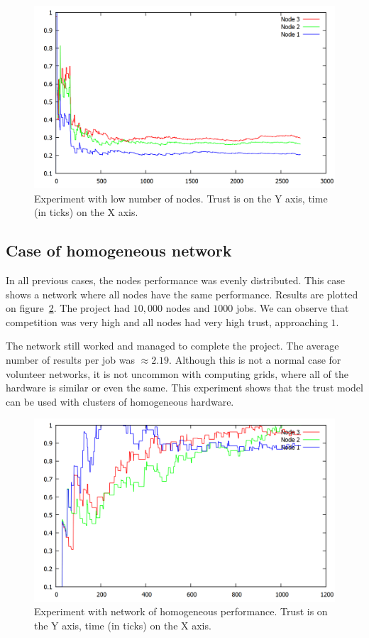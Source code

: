 \begin{figure}
\centering
\includegraphics[width=\textwidth]{diagrams/trust_less_nodes.png}
\caption{Experiment with low number of nodes. Trust is on the Y axis, time (in ticks) on the X axis.}
\label{f:more_jobs}
\end{figure}

\FloatBarrier

\subsection{Case of homogeneous network}

In all previous cases, the nodes performance was evenly distributed. This case shows a network where all nodes have the same performance. Results are plotted on figure~\ref{f:evenly}. The project had $10,000$ nodes and $1000$ jobs. We can observe that competition was very high and all nodes had very high trust, approaching $1$.

The network still worked and managed to complete the project. The average number of results per job was $\approx 2.19$. Although this is not a normal case for volunteer networks, it is not uncommon with computing grids, where all of the hardware is similar or even the same. This experiment shows that the trust model can be used with clusters of homogeneous hardware.

\begin{figure}
\centering
\includegraphics[width=\textwidth]{diagrams/trust_static.png}
\caption{Experiment with network of homogeneous performance. Trust is on the Y axis, time (in ticks) on the X axis.}
\label{f:evenly}
\end{figure}
